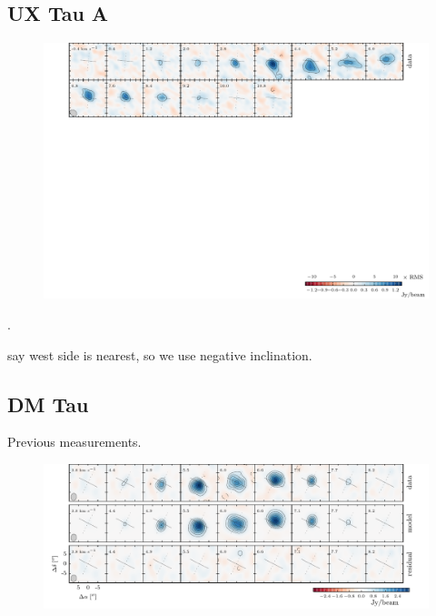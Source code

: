 \documentclass[twocolumn]{aastex6}
\begin{document}

\subsection{UX Tau A}

\begin{figure}[htb]
\begin{center}
  \includegraphics[draft]{UXTauA.pdf}
  \end{center}
\end{figure}

\citep{espaillat07}.

\citet{tanii12} say west side is nearest, so we use negative inclination.


\subsection{DM Tau}
Previous measurements.

\begin{figure}[htb]
\begin{center}
  \includegraphics{DMTau.pdf}
  \end{center}
\end{figure}
\end{document}
